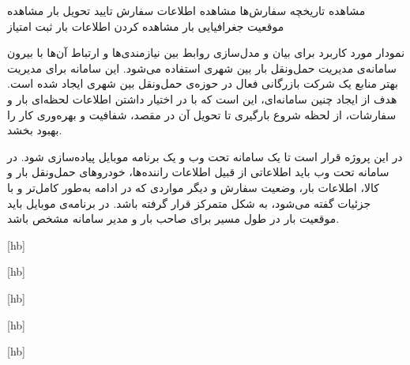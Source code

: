 	 
		 مشاهده تاریخچه سفارش‌ها
		 مشاهده اطلاعات سفارش
		 تایید تحویل بار
		 مشاهده موقعیت جغرافیایی بار
		 مشاهده کردن اطلاعات بار
		 ثبت امتیاز

\newpage


نمودار مورد کاربرد برای بیان و مدل‌سازی روابط بین نیازمندی‌ها و ارتباط آن‌ها با بیرون سامانه‌ی مدیریت حمل‌ونقل بار بین شهری استفاده می‌شود. این سامانه برای مدیریت بهتر منابع یک شرکت بازرگانی فعال در حوزه‌ی حمل‌ونقل بین شهری ایجاد شده است. هدف از ایجاد چنین سامانه‌ای، این است که با در اختیار داشتن اطلاعات لحظه‌ای بار و سفارشات، از لحظه شروع بارگیری تا تحویل آن در مقصد، شفافیت و بهره‌وری کار را بهبود بخشد. 

در این پروژه قرار است تا یک سامانه تحت وب و یک برنامه موبایل پیاده‌سازی شود. در سامانه تحت وب باید اطلاعاتی از قبیل اطلاعات راننده‌ها، خودروهای حمل‌ونقل بار و کالا، اطلاعات بار، وضعیت سفارش و دیگر مواردی که در ادامه  به‌طور کامل‌تر و با جزئیات گفته می‌شود، به شکل متمرکز قرار گرفته باشد. در برنامه‌ی موبایل باید موقعیت بار در طول مسیر برای صاحب بار و مدیر سامانه مشخص باشد.



[hb]



[hb]



[hb]


[hb]


[hb]

